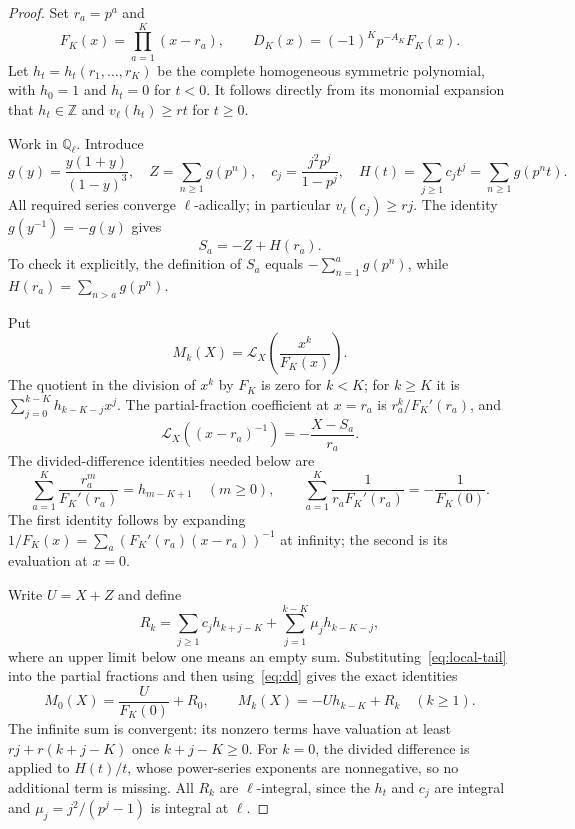 \documentclass[11pt]{article}
\theoremstyle{remark}
\newcommand{\Z}{\mathbb Z}
\newcommand{\Q}{\mathbb Q}
\newcommand{\Lcal}{\mathcal L}
\begin{document}
\begin{proof}
Set $r_a=p^a$ and
\[
 F_K(x)=\prod_{a=1}^K(x-r_a),\qquad
 D_K(x)=(-1)^Kp^{-A_K}F_K(x).
\]
Let $h_t=h_t(r_1,\ldots,r_K)$ be the complete homogeneous symmetric
polynomial, with $h_0=1$ and $h_t=0$ for $t<0$. It follows directly
from its monomial expansion that $h_t\in\Z$ and
$v_\ell(h_t)\ge rt$ for $t\ge0$.

Work in $\Q_\ell$. Introduce
\[
 g(y)=\frac{y(1+y)}{(1-y)^3},\quad
 Z=\sum_{n\ge1}g(p^n),\quad
 c_j=\frac{j^2p^j}{1-p^j},\quad
 H(t)=\sum_{j\ge1}c_jt^j=\sum_{n\ge1}g(p^nt).
\]
All required series converge $\ell$-adically; in particular
$v_\ell(c_j)\ge rj$. The identity $g(y^{-1})=-g(y)$ gives
\begin{equation}\label{eq:local-tail}
 S_a=-Z+H(r_a).
\end{equation}
To check it explicitly, the definition of $S_a$ equals
$-\sum_{n=1}^ag(p^n)$, while $H(r_a)=\sum_{n>a}g(p^n)$.

Put
\[
 M_k(X)=\Lcal_X\left(\frac{x^k}{F_K(x)}\right).
\]
The quotient in the division of $x^k$ by $F_K$ is zero for $k<K$;
for $k\ge K$ it is
$\sum_{j=0}^{k-K}h_{k-K-j}x^j$.
The partial-fraction coefficient at $x=r_a$ is
$r_a^k/F_K'(r_a)$, and
\[
 \Lcal_X((x-r_a)^{-1})=-\frac{X-S_a}{r_a}.
\]
The divided-difference identities needed below are
\begin{equation}\label{eq:dd}
 \sum_{a=1}^K\frac{r_a^m}{F_K'(r_a)}=h_{m-K+1}\quad(m\ge0),
 \qquad
 \sum_{a=1}^K\frac1{r_aF_K'(r_a)}=-\frac1{F_K(0)}.
\end{equation}
The first identity follows by expanding
$1/F_K(x)=\sum_a(F_K'(r_a)(x-r_a))^{-1}$ at infinity;
the second is its evaluation at $x=0$.

Write $U=X+Z$ and define
\begin{equation}\label{eq:Rk}
 R_k=\sum_{j\ge1}c_jh_{k+j-K}
       +\sum_{j=1}^{k-K}\mu_jh_{k-K-j},
\end{equation}
where an upper limit below one means an empty sum.
Substituting~\eqref{eq:local-tail} into the partial fractions and then
using~\eqref{eq:dd} gives the exact identities
\begin{equation}\label{eq:Mk}
 M_0(X)=\frac{U}{F_K(0)}+R_0,\qquad
 M_k(X)=-Uh_{k-K}+R_k\quad(k\ge1).
\end{equation}
The infinite sum is convergent: its nonzero terms have valuation at
least $rj+r(k+j-K)$ once $k+j-K\ge0$.
For $k=0$, the divided difference is applied to $H(t)/t$, whose
power-series exponents are nonnegative, so no additional term is
missing. All $R_k$ are $\ell$-integral, since the $h_t$ and $c_j$ are
integral and $\mu_j=j^2/(p^j-1)$ is integral at $\ell$.


\end{proof}
\end{document}
